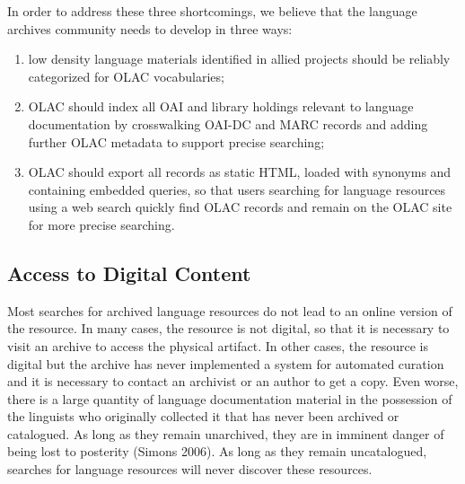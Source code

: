 
In order to address these three shortcomings, we believe that the
language archives community needs to develop in three ways:

\begin{enumerate}\setlength{\itemsep}{0pt}
\item low density language materials identified in allied projects
      should be reliably categorized for OLAC vocabularies;
\item OLAC should index all OAI and library holdings relevant to language
      documentation by crosswalking OAI-DC and MARC records and
      adding further OLAC metadata to support precise searching;
\item OLAC should export all records as static HTML, loaded with
      synonyms and containing embedded queries, so that
      users searching for language resources using a web search
      quickly find OLAC records and remain on the OLAC site for
      more precise searching.
\end{enumerate}

\subsection{Access to Digital Content}


Most searches for archived language resources do not lead to an online version
of the resource.  In many cases, the resource is not digital, so
that it is necessary to visit an archive to access the physical artifact.
In other cases, the resource is digital but the archive has never
implemented a system for automated curation and it is necessary to
contact an archivist or an author to get a copy.  Even worse, there is a large quantity of language
documentation material in the possession of the linguists who
originally collected it that has never been archived or catalogued.
As long as they remain unarchived, they are in imminent danger of
being lost to posterity (Simons 2006). 
As long as they remain uncatalogued, searches for language resources
will never discover these resources.


